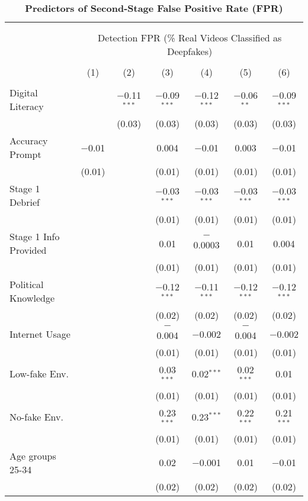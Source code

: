 
\begin{table}[!htbp] \centering 
  \caption{\textbf{Predictors of Second-Stage False Positive Rate (FPR)}} 
  \label{secondstage_fpr} 
\footnotesize 
\begin{tabular}{@{\extracolsep{1pt}}lcccccc} 
\\[-1.8ex]\hline 
\hline \\[-1.8ex] 
\\[-1.8ex] & \multicolumn{6}{c}{\normalsize Detection FPR (\% Real Videos Classified as Deepfakes)} \\ 
\\[-1.8ex] & (1) & (2) & (3) & (4) & (5) & (6)\\ 
\hline \\[-1.8ex] 
 Digital Literacy &  & $-$0.11$^{***}$ & $-$0.09$^{***}$ & $-$0.12$^{***}$ & $-$0.06$^{**}$ & $-$0.09$^{***}$ \\ 
  &  & (0.03) & (0.03) & (0.03) & (0.03) & (0.03) \\ 
  Accuracy Prompt & $-$0.01 &  & 0.004 & $-$0.01 & 0.003 & $-$0.01 \\ 
  & (0.01) &  & (0.01) & (0.01) & (0.01) & (0.01) \\ 
  Stage 1 Debrief &  &  & $-$0.03$^{***}$ & $-$0.03$^{***}$ & $-$0.03$^{***}$ & $-$0.03$^{***}$ \\ 
  &  &  & (0.01) & (0.01) & (0.01) & (0.01) \\ 
  Stage 1 Info Provided &  &  & 0.01 & $-$0.0003 & 0.01 & 0.004 \\ 
  &  &  & (0.01) & (0.01) & (0.01) & (0.01) \\ 
  Political Knowledge &  &  & $-$0.12$^{***}$ & $-$0.11$^{***}$ & $-$0.12$^{***}$ & $-$0.12$^{***}$ \\ 
  &  &  & (0.02) & (0.02) & (0.02) & (0.02) \\ 
  Internet Usage &  &  & $-$0.004 & $-$0.002 & $-$0.004 & $-$0.002 \\ 
  &  &  & (0.01) & (0.01) & (0.01) & (0.01) \\ 
  Low-fake Env. &  &  & 0.03$^{***}$ & 0.02$^{***}$ & 0.02$^{***}$ & 0.01 \\ 
  &  &  & (0.01) & (0.01) & (0.01) & (0.01) \\ 
  No-fake Env. &  &  & 0.23$^{***}$ & 0.23$^{***}$ & 0.22$^{***}$ & 0.21$^{***}$ \\ 
  &  &  & (0.01) & (0.01) & (0.01) & (0.01) \\ 
  Age groups 25-34 &  &  & 0.02 & $-$0.001 & 0.01 & $-$0.01 \\ 
  &  &  & (0.02) & (0.02) & (0.02) & (0.02) \\ 

\end{tabular}
\end{table}
